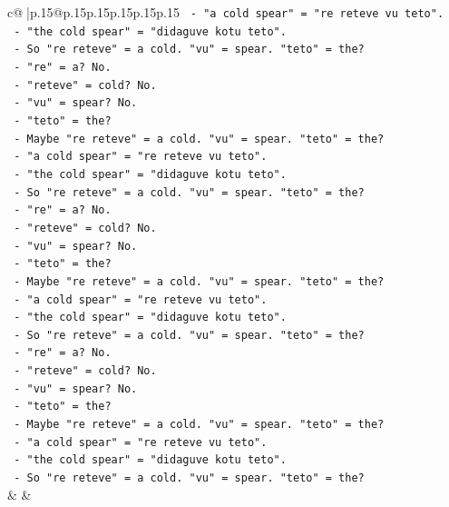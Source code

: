 \documentclass{article}
\begin{document}
{\begin{supertabular}{c@{$\;$}|p{.15\linewidth}@{}p{.15\linewidth}p{.15\linewidth}p{.15\linewidth}p{.15\linewidth}p{.15\linewidth}}
{{{\texttt{   {-} "a cold spear" = "re reteve vu teto".} \\
\texttt{   {-} "the cold spear" = "didaguve kotu teto".} \\
\texttt{   {-} So "re reteve" = a cold. "vu" = spear. "teto" = the?} \\
\texttt{   {-} "re" = a? No.} \\
\texttt{   {-} "reteve" = cold? No.} \\
\texttt{   {-} "vu" = spear? No.} \\
\texttt{   {-} "teto" = the?} \\
\texttt{   {-} Maybe "re reteve" = a cold. "vu" = spear. "teto" = the?} \\
\texttt{   {-} "a cold spear" = "re reteve vu teto".} \\
\texttt{   {-} "the cold spear" = "didaguve kotu teto".} \\
\texttt{   {-} So "re reteve" = a cold. "vu" = spear. "teto" = the?} \\
\texttt{   {-} "re" = a? No.} \\
\texttt{   {-} "reteve" = cold? No.} \\
\texttt{   {-} "vu" = spear? No.} \\
\texttt{   {-} "teto" = the?} \\
\texttt{   {-} Maybe "re reteve" = a cold. "vu" = spear. "teto" = the?} \\
\texttt{   {-} "a cold spear" = "re reteve vu teto".} \\
\texttt{   {-} "the cold spear" = "didaguve kotu teto".} \\
\texttt{   {-} So "re reteve" = a cold. "vu" = spear. "teto" = the?} \\
\texttt{   {-} "re" = a? No.} \\
\texttt{   {-} "reteve" = cold? No.} \\
\texttt{   {-} "vu" = spear? No.} \\
\texttt{   {-} "teto" = the?} \\
\texttt{   {-} Maybe "re reteve" = a cold. "vu" = spear. "teto" = the?} \\
\texttt{   {-} "a cold spear" = "re reteve vu teto".} \\
\texttt{   {-} "the cold spear" = "didaguve kotu teto".} \\
\texttt{   {-} So "re reteve" = a cold. "vu" = spear. "teto" = the?} \\
            }
        }
    }
    & & \\ \\


\end{supertabular}}
\end{document}
